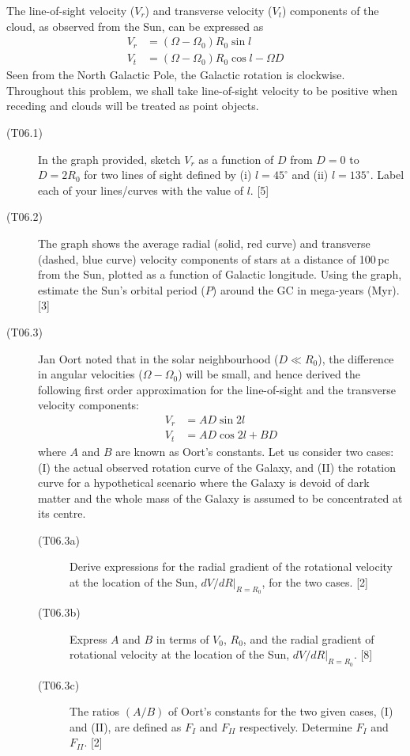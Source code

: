 The line-of-sight velocity ($V_r$) and transverse velocity ($V_t$) components of
the cloud, as observed from the Sun, can be expressed as
\begin{align*}
  V_r &= (\Omega - \Omega_0) R_0 \sin l \\
  V_t &= (\Omega - \Omega_0) R_0 \cos l - \Omega D
\end{align*}
Seen from the North Galactic Pole, the Galactic rotation is clockwise.
Throughout this problem, we shall take line-of-sight velocity to be positive when
receding and clouds will be treated as point objects.

\begin{description}
\item[(T06.1)] In the graph provided, sketch $V_r$ as a function of $D$ from
  $D = 0$ to $D = 2R_0$ for two lines of sight defined by (i) $l = 45^\circ$ and
  (ii) $l = 135^\circ$. Label each of your lines/curves with the value of $l$.
  \hfill[5]
\item[(T06.2)] The graph shows the average radial (solid, red curve) and
  transverse (dashed, blue curve) velocity components of stars at a distance of
  100\,pc from the Sun, plotted as a function of Galactic longitude. Using the
  graph, estimate the Sun's orbital period ($P$) around the GC in mega-years
  (Myr). \hfill[3]
\item[(T06.3)] Jan Oort noted that in the solar neighbourhood ($D \ll R_0$), the
  difference in angular velocities ($\Omega - \Omega_0$) will be small, and hence
  derived the following first order approximation for the line-of-sight and the
  transverse velocity components:
  \begin{align*}
    V_r &= A D \sin 2l \\
    V_t &= A D \cos 2l + B D
  \end{align*}
  where $A$ and $B$ are known as Oort's constants. Let us consider two cases:
  (I) the actual observed rotation curve of the Galaxy, and (II) the rotation
  curve for a hypothetical scenario where the Galaxy is devoid of dark matter and
  the whole mass of the Galaxy is assumed to be concentrated at its centre.
  \begin{description}
  \item[(T06.3a)] Derive expressions for the radial gradient of the rotational
    velocity at the location of the Sun, $\left.dV/dR\right|_{R=R_0}$, for the
    two cases. \hfill[2]
  \item[(T06.3b)] Express $A$ and $B$ in terms of $V_0$, $R_0$, and the radial
    gradient of rotational velocity at the location of the Sun,
    $\left.dV/dR\right|_{R=R_0}$. \hfill[8]
  \item[(T06.3c)] The ratios $(A/B)$ of Oort's constants for the two given
    cases, (I) and (II), are defined as $F_I$ and $F_{II}$ respectively.
    Determine $F_I$ and $F_{II}$. \hfill[2]
  \end{description}
\end{description}


